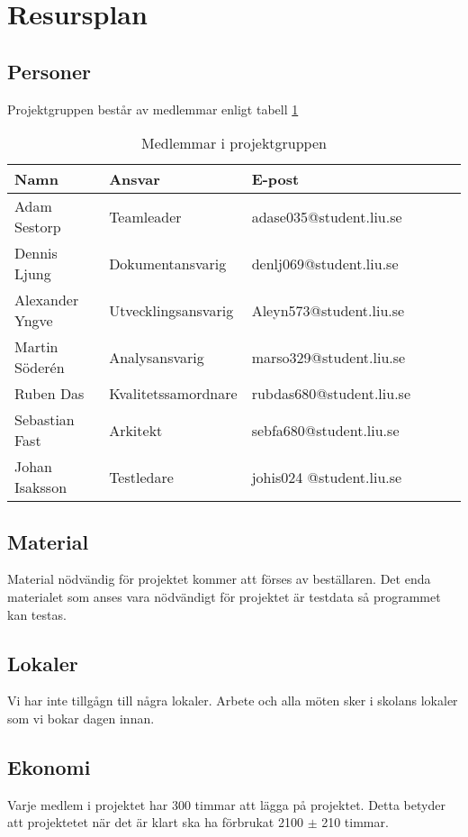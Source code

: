 \section{Resursplan}

\subsection{Personer}
Projektgruppen består av medlemmar enligt tabell \ref{projektplan:resursplan-personer}
\begin{table}[h]
	\centering
		\begin{tabularx}{\textwidth}{| l | l | X | l | l | l |}
			\hline
			\textbf{Namn} & \textbf{Ansvar} & \textbf{E-post} \\
			\hline
			{Adam Sestorp} & {Teamleader} & {adase035@student.liu.se} \\\hline
			{Dennis Ljung} & {Dokumentansvarig} & {denlj069@student.liu.se} \\\hline
			{Alexander Yngve} & {Utvecklingsansvarig} & {Aleyn573@student.liu.se} \\\hline
			{Martin Söderén} & {Analysansvarig} & {marso329@student.liu.se} \\\hline
			{Ruben Das} & {Kvalitetssamordnare} & {rubdas680@student.liu.se} \\\hline
			{Sebastian Fast} & {Arkitekt} & {sebfa680@student.liu.se} \\\hline
			{Johan Isaksson } & {Testledare} & {johis024	@student.liu.se} \\\hline
		\end{tabularx}
	\caption{Medlemmar i projektgruppen} \label{projektplan:resursplan-personer}
\end{table}

\subsection{Material}
Material nödvändig för projektet kommer att förses av beställaren. Det enda materialet som anses vara nödvändigt för projektet är testdata så programmet kan testas.

\subsection{Lokaler}
Vi har inte tillgågn till några lokaler. Arbete och alla möten sker i skolans lokaler som vi bokar dagen innan. 

\subsection{Ekonomi}
Varje medlem i projektet har 300 timmar att lägga på projektet. Detta betyder att projektetet när det är klart ska ha förbrukat 2100 $\pm $ 210 timmar.